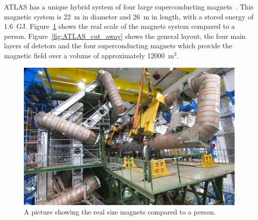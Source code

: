 ATLAS has a unique hybrid system of four large superconducting 
magnets~\cite{ATLAS-TDR-06}. This magnetic system is 22~m in diameter and 26~m in length, 
with a stored energy of 1.6~GJ. Figure~\ref{fig:ATLAS_magnets_site} shows the real scale of
the magnets system compared to a person. 
Figure~\ref{fig:ATLAS_cut_away} shows the general layout, 
the four main layers of detetors and the four superconducting 
magnets which provide the magnetic
field over a volume of approximately 12000~m$^3$.



\begin{figure}[bht]
	\begin{centering}	
	\includegraphics[width=.8\textwidth]{Detector_plots/magnets.jpg}
	\caption{A picture showing the real size magnets compared to a person.}
	\label{fig:ATLAS_magnets_site}
	\end{centering}
\end{figure}




